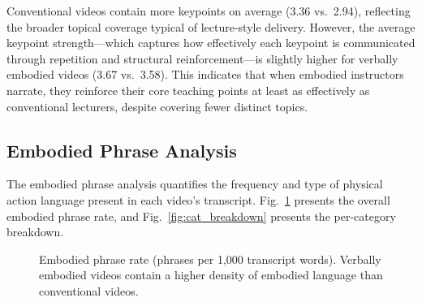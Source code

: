 Conventional videos contain more keypoints on average (3.36 vs.\ 2.94), reflecting the broader topical coverage typical of lecture-style delivery. However, the average keypoint strength---which captures how effectively each keypoint is communicated through repetition and structural reinforcement---is slightly higher for verbally embodied videos (3.67 vs.\ 3.58). This indicates that when embodied instructors narrate, they reinforce their core teaching points at least as effectively as conventional lecturers, despite covering fewer distinct topics.


\subsection{Embodied Phrase Analysis}

The embodied phrase analysis quantifies the frequency and type of physical action language present in each video's transcript. Fig.~\ref{fig:phrase_rate} presents the overall embodied phrase rate, and Fig.~\ref{fig:cat_breakdown} presents the per-category breakdown.

\begin{figure}[h!]
    \centering
    \caption{Embodied phrase rate (phrases per 1{,}000 transcript words). Verbally embodied videos contain a higher density of embodied language than conventional videos.}
    \label{fig:phrase_rate}
\end{figure}

